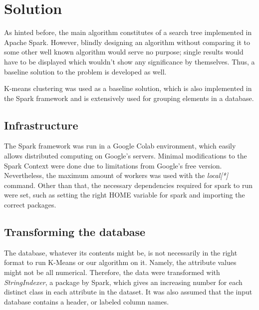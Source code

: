 \documentclass[sigconf]{acmart}
\begin{document}
\section{Solution}\label{Solution}
As hinted before, the main algorithm constitutes of a search tree implemented in Apache Spark. However, blindly designing an algorithm without comparing it to some other well known algorithm would serve no purpose; single results would have to be displayed which wouldn't show any significance by themselves. Thus, a baseline solution to the problem is developed as well.

K-means clustering was used as a baseline solution, which is also implemented in the Spark framework and is extensively used for grouping elements in a database.

\subsection{Infrastructure}
The Spark framework was run in a Google Colab environment, which easily allows distributed computing on Google's servers. Minimal modifications to the Spark Context were done due to limitations from Google's free version. Nevertheless, the maximum amount of workers was used with the \textit{local[*]} command. Other than that, the necessary dependencies required for spark to run were set, such as setting the right HOME variable for spark and importing the correct packages.


\subsection{Transforming the database}\label{TransformingDatabase}
The database, whatever its contents might be, is not necessarily in the right format to run K-Means or our algorithm on it. Namely, the attribute values might not be all numerical. Therefore, the data were transformed with \textit{StringIndexer}, a package by Spark, which gives an increasing number for each distinct class in each attribute in the dataset. It was also assumed that the input database contains a header, or labeled column names.
\end{document}
